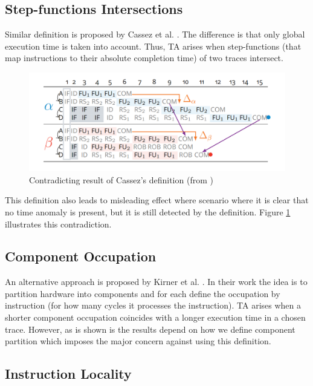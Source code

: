 \subsection{Step-functions Intersections}

Similar definition is proposed by Cassez et al. \cite{cassez_what_2012}. The difference is that only global execution time is taken into account. Thus, TA arises when step-functions (that map instructions to their absolute completion time) of two traces intersect. 

\begin{figure}[!htb]
    \centering
    \includegraphics[width=\textwidth]{figures/step-func-2-bad.png}
    \caption{Contradicting result of Cassez's definition (from \cite{binder_definitions_2022})}
    \label{fig:step-2}
\end{figure}

This definition also leads to misleading effect where scenario \cite{binder_definitions_2022} where it is clear that no time anomaly is present, but it is still detected by the definition. Figure \ref{fig:step-2} illustrates this contradiction. 

\subsection{Component Occupation}

An alternative approach is proposed by Kirner et al. \cite{kirner_precise_2009}. In their work the idea is to partition hardware into components and for each define the occupation by instruction (for how many cycles it processes the instruction). TA arises when a shorter component occupation coincides with a longer execution time in a chosen trace. However, as is shown is \cite{binder_definitions_2022} the results depend on how we define component partition which imposes the major concern against using this definition.

\subsection{Instruction Locality}
